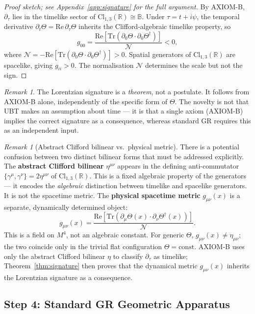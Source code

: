 \documentclass[12pt,a4paper]{article}
\theoremstyle{definition}
\theoremstyle{remark}
\newtheorem{remark}[theorem]{Remark}
\newcommand{\BB}{\mathbb{B}}
\newcommand{\RR}{\mathbb{R}}
\newcommand{\Tr}{\mathrm{Tr}}
\newcommand{\re}{\mathrm{Re}}
\newcommand{\calN}{\mathcal{N}}
\begin{document}
\begin{proof}[Proof sketch; see Appendix~\ref{app:signature} for the full argument]
By AXIOM-B, $\partial_\tau$ lies in the timelike sector of
$\mathrm{Cl}_{1,3}(\RR) \cong \BB$.
Under $\tau = t + i\psi$, the temporal derivative
$\partial_t\Theta = \re\,\partial_\tau\Theta$
inherits the Clifford-algebraic timelike property, so
\[
  g_{00}
  = \frac{\re[\Tr(\partial_0\Theta \cdot \partial_0\Theta^\dagger)]}{\calN} < 0,
\]
where $\calN = -\re[\Tr(\partial_0\Theta \cdot \partial_0\Theta^\dagger)] > 0$.
Spatial generators of $\mathrm{Cl}_{1,3}(\RR)$ are spacelike, giving $g_{ii} > 0$.
The normalisation $\calN$ determines the scale but not the sign.
\end{proof}

\begin{remark}
The Lorentzian signature is a \emph{theorem}, not a postulate.
It follows from AXIOM-B alone, independently of the specific form of $\Theta$.
The novelty is not that UBT makes an assumption about time --- it is that a single
axiom (AXIOM-B) implies the correct signature as a consequence, whereas standard
GR requires this as an independent input.
\end{remark}

\begin{remark}[Abstract Clifford bilinear vs.\ physical metric]
\label{rem:clifford_vs_metric}
There is a potential confusion between two distinct bilinear forms that must
be addressed explicitly.
The \textbf{abstract Clifford bilinear} $\eta^{\mu\nu}$ appears in the
defining anti-commutator $\{\gamma^\mu,\gamma^\nu\} = 2\eta^{\mu\nu}$ of
$\mathrm{Cl}_{1,3}(\RR)$.
This is a fixed algebraic property of the generators --- it encodes the
\emph{algebraic} distinction between timelike and spacelike generators.
It is not the spacetime metric.
The \textbf{physical spacetime metric} $g_{\mu\nu}(x)$ is a separate,
dynamically determined object:
\[
  g_{\mu\nu}(x)
  = \frac{\re[\Tr(\partial_\mu\Theta(x) \cdot \partial_\nu\Theta^\dagger(x))]}{\calN}.
\]
This is a field on $M^4$, not an algebraic constant.
For generic $\Theta$, $g_{\mu\nu}(x) \neq \eta_{\mu\nu}$; the two coincide
only in the trivial flat configuration $\Theta = \mathrm{const}$.
AXIOM-B uses only the abstract Clifford bilinear $\eta$ to classify
$\partial_\tau$ as timelike; Theorem~\ref{thm:signature} then proves that
the dynamical metric $g_{\mu\nu}(x)$ inherits the Lorentzian signature
as a consequence.
\end{remark}

\subsection{Step 4: Standard GR Geometric Apparatus}
\label{sec:step4}
\end{document}
